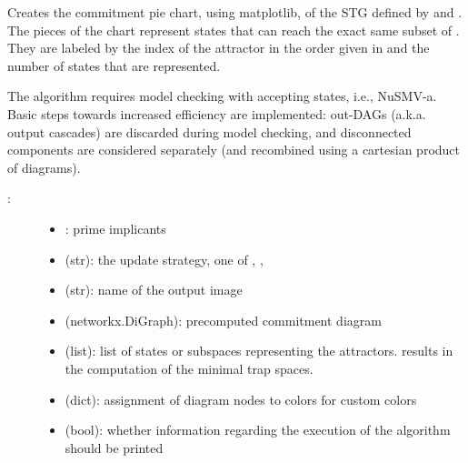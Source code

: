 \documentclass[letterpaper,10pt,english]{sphinxmanual}
\begin{document}
\begin{fulllineitems}
\label{\detokenize{Basins:PyBoolNet.Basins.commitment_pie}}
Creates the commitment pie chart, using matplotlib, of the STG defined by  and .
The pieces of the chart represent states that can reach the exact same subset of .
They are labeled by the index of the attractor in the order given in  and the number of states
that are represented.

The algorithm requires model checking with accepting states, i.e., NuSMV-a.
Basic steps towards increased efficiency are implemented:
out-DAGs (a.k.a. output cascades) are discarded during model checking, and
disconnected components are considered separately (and recombined using a cartesian product of diagrams).
\begin{description}
\item[{:}] \leavevmode\begin{itemize}
\item {} 
: prime implicants

\item {} 
 (str): the update strategy, one of , , 

\item {} 
 (str): name of the output image

\item {} 
 (networkx.DiGraph): precomputed commitment diagram

\item {} 
 (list): list of states or subspaces representing the attractors.  results in the computation of the minimal trap spaces.

\item {} 
 (dict): assignment of diagram nodes to colors for custom colors

\item {} 
 (bool): whether information regarding the execution of the algorithm should be printed


\end{itemize}
\end{description}
\end{fulllineitems}
\end{document}
